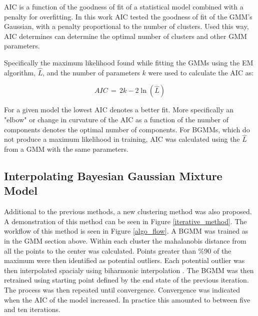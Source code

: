 \documentclass[a4paper,11pt]{article}
\begin{document}
AIC is a function of the goodness of fit of a statistical model combined with a penalty for overfitting. In this work AIC tested the goodness of fit of the GMM's Gaussian, with a penalty proportional to the number of clusters. Used this way, AIC determines can determine the optimal number of clusters and other GMM parameters.

Specifically the maximum likelihood found while fitting the GMMs using the EM algorithm, $\hat L$, and the number of parameters $k$ were used to calculate the AIC as:

\begin{equation}
    AIC \, = \, 2k - 2\ln(\hat L)
\end{equation}

For a given model the lowest AIC denotes a better fit. More specifically an "elbow" or change in curvature of the AIC as a function of the number of components denotes the optimal number of components. For BGMMs, which do not produce a maximum likelihood in training, AIC was calculated using the $\hat L$ from a GMM with the same parameters.

\subsection{Interpolating Bayesian Gaussian Mixture Model}

Additional to the previous methods, a new clustering method was also proposed.  A demonstration of this method can be seen in Figure \ref{iterative_method}. The workflow of this method is seen in Figure \ref{algo_flow}. A BGMM was trained as in the GMM section above. Within each cluster the mahalanobis distance \cite{Mahalanobis1936OnStatistics} from all the points to the center was calculated. Points greater than \%90 of the maximum were then identified as potential outliers. Each potential outlier was then interpolated spacialy using biharmonic interpolation \cite{Damelin2017OnAspects}. The BGMM was then retrained using starting point defined by the end state of the previous iteration. The process was then repeated until convergence. Convergence was indicated when the AIC of the model increased. In practice this amounted to between five and ten iterations.
\end{document}
